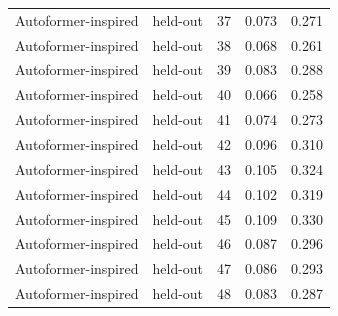 \begin{tabular}{llrrr}
Autoformer-inspired & held-out & 37 & 0.073 & 0.271 \\
Autoformer-inspired & held-out & 38 & 0.068 & 0.261 \\
Autoformer-inspired & held-out & 39 & 0.083 & 0.288 \\
Autoformer-inspired & held-out & 40 & 0.066 & 0.258 \\
Autoformer-inspired & held-out & 41 & 0.074 & 0.273 \\
Autoformer-inspired & held-out & 42 & 0.096 & 0.310 \\
Autoformer-inspired & held-out & 43 & 0.105 & 0.324 \\
Autoformer-inspired & held-out & 44 & 0.102 & 0.319 \\
Autoformer-inspired & held-out & 45 & 0.109 & 0.330 \\
Autoformer-inspired & held-out & 46 & 0.087 & 0.296 \\
Autoformer-inspired & held-out & 47 & 0.086 & 0.293 \\
Autoformer-inspired & held-out & 48 & 0.083 & 0.287 \\
\bottomrule
\end{tabular}
